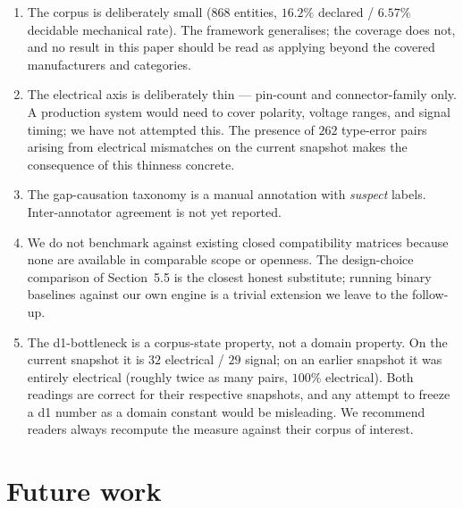 \documentclass[11pt,twocolumn]{article}
\begin{document}
\begin{enumerate}[nosep]
\item The corpus is deliberately small ($868$ entities, $16.2\%$
declared / $6.57\%$ decidable mechanical rate). The framework
generalises; the coverage does not, and no result in this paper
should be read as applying beyond the covered manufacturers and
categories.

\item The electrical axis is deliberately thin --- pin-count and
connector-family only. A production system would need to cover
polarity, voltage ranges, and signal timing; we have not attempted
this. The presence of $262$ type-error pairs arising from
electrical mismatches on the current snapshot makes the
consequence of this thinness concrete.

\item The gap-causation taxonomy is a manual annotation with
\emph{suspect} labels. Inter-annotator agreement is not yet reported.

\item We do not benchmark against existing closed compatibility
matrices because none are available in comparable scope or openness.
The design-choice comparison of Section~5.5 is the closest honest
substitute; running binary baselines against our own engine is a
trivial extension we leave to the follow-up.

\item The d1-bottleneck is a corpus-state property, not a domain
property. On the current snapshot it is $32$ electrical / $29$
signal; on an earlier snapshot it was entirely electrical (roughly
twice as many pairs, $100\%$ electrical). Both readings are correct
for their respective snapshots, and any attempt to freeze a d1
number as a domain constant would be misleading. We recommend
readers always recompute the measure against their corpus of
interest.
\end{enumerate}

\section{Future work}
\end{document}
